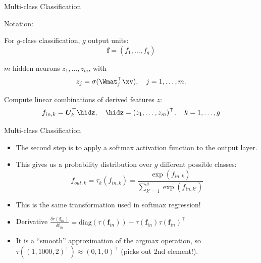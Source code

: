 \begin{frame} {Multi-class Classification}
    \vspace{5mm}
    \begin{blocki}{Notation:}
    \item For $g$-class classification, $g$ output units: $$\mathbf{f} = (f_1, \dots, f_g)$$
    \vspace{4mm}
    \item $m$ hidden neurons $z_1, \dots, z_m$, with
    $$ z_j = \sigma(\Wmat_j^\top \xv), \quad j = 1,\ldots,m. $$
    \item Compute linear combinations of derived features $z$:
    $$ f_{in,k} = \bm{U}_k^\top \hidz, \quad \hidz=(z_1,\dots, z_m)^\top, \quad k = 1,\ldots,g$$
  \end{blocki}
\end{frame}

\begin{frame} {Multi-class Classification}
  \begin{itemize}
    \item The second step is to apply a softmax activation function to the output layer.
    \vspace{4mm}
    \item This gives us a probability distribution over $g$ different possible classes:
    $$ f_{out,k} = \tau_k(f_{in,k}) = \frac{\exp(f_{in,k})}{\sum_{k'=1}^g\exp(f_{in,k'})}$$
    \vspace{2mm}
    \item This is the same transformation used in softmax regression!
    \vspace{4mm}
    \item Derivative $ \frac{\delta\tau(\mathbf{f}_{in})}{\delta \mathbf{f}_{in}} = \text{diag}(\tau(\mathbf{f}_{in})) - \tau(\mathbf{f}_{in}) \tau(\mathbf{f}_{in})^\top $
    \vspace{4mm}
    \item It is a \enquote{smooth} approximation of the argmax operation,
        so $\tau((1, 1000, 2)^\top) \approx (0, 1, 0)^\top$ (picks out 2nd element!).
  \end{itemize}
\end{frame}

